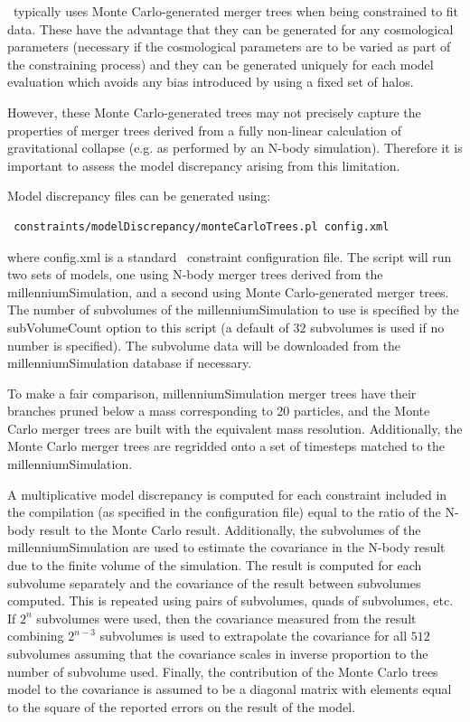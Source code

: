 \glc\ typically uses Monte Carlo-generated merger trees when being constrained to fit data. These have the advantage that they can be generated for any cosmological parameters (necessary if the cosmological parameters are to be varied as part of the constraining process) and they can be generated uniquely for each model evaluation which avoids any bias introduced by using a fixed set of halos.

However, these Monte Carlo-generated trees may not precisely capture the properties of merger trees derived from a fully non-linear calculation of gravitational collapse (e.g. as performed by an N-body simulation). Therefore it is important to assess the model discrepancy arising from this limitation.

Model discrepancy files can be generated using:
\begin{verbatim}
 constraints/modelDiscrepancy/monteCarloTrees.pl config.xml
\end{verbatim}
where {\normalfont \ttfamily config.xml} is a standard \glc\ constraint configuration file. The script will run two sets of models, one using N-body merger trees derived from the \gls{millenniumSimulation}, and a second using Monte Carlo-generated merger trees. The number of subvolumes of the \gls{millenniumSimulation} to use is specified by the {\normalfont \ttfamily subVolumeCount} option to this script (a default of $32$ subvolumes is used if no number is specified). The subvolume data will be downloaded from the \gls{millenniumSimulation} database if necessary.

To make a fair comparison, \gls{millenniumSimulation} merger trees have their branches pruned below a mass corresponding to $20$ particles, and the Monte Carlo merger trees are built with the equivalent mass resolution. Additionally, the Monte Carlo merger trees are regridded onto a set of timesteps matched to the \gls{millenniumSimulation}.

A multiplicative model discrepancy is computed for each constraint included in the compilation (as specified in the configuration file) equal to the ratio of the N-body result to the Monte Carlo result. Additionally, the subvolumes of the \gls{millenniumSimulation} are used to estimate the covariance in the N-body result due to the finite volume of the simulation. The result is computed for each subvolume separately and the covariance of the result between subvolumes computed. This is repeated using pairs of subvolumes, quads of subvolumes, etc. If $2^n$ subvolumes were used, then the covariance measured from the result combining $2^{n-3}$ subvolumes is used to extrapolate the covariance for all $512$ subvolumes assuming that the covariance scales in inverse proportion to the number of subvolume used. Finally, the contribution of the Monte Carlo trees model to the covariance is assumed to be a diagonal matrix with elements equal to the square of the reported errors on the result of the model.

